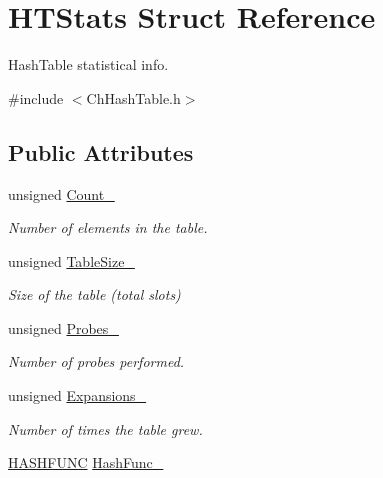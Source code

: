 \hypertarget{structHTStats}{\section{H\-T\-Stats Struct Reference}
\label{structHTStats}
}


Hash\-Table statistical info.  




{\ttfamily \#include $<$Ch\-Hash\-Table.\-h$>$}

\subsection*{Public Attributes}
\begin{DoxyCompactItemize}
\item 
\hypertarget{structHTStats_a4b58ca272c9d26e53e96209935b71640}{unsigned \hyperlink{structHTStats_a4b58ca272c9d26e53e96209935b71640}{Count\-\_\-}}\label{structHTStats_a4b58ca272c9d26e53e96209935b71640}

\begin{DoxyCompactList}\small\item\em Number of elements in the table. \end{DoxyCompactList}\item 
\hypertarget{structHTStats_aa41b26cb10af60fa575642a92a253c88}{unsigned \hyperlink{structHTStats_aa41b26cb10af60fa575642a92a253c88}{Table\-Size\-\_\-}}\label{structHTStats_aa41b26cb10af60fa575642a92a253c88}

\begin{DoxyCompactList}\small\item\em Size of the table (total slots) \end{DoxyCompactList}\item 
\hypertarget{structHTStats_a5f8a4b7dd26d477b0810b8e2d0362b67}{unsigned \hyperlink{structHTStats_a5f8a4b7dd26d477b0810b8e2d0362b67}{Probes\-\_\-}}\label{structHTStats_a5f8a4b7dd26d477b0810b8e2d0362b67}

\begin{DoxyCompactList}\small\item\em Number of probes performed. \end{DoxyCompactList}\item 
\hypertarget{structHTStats_aedd2ff3fc7953b3bc1cfb28152c2bcfb}{unsigned \hyperlink{structHTStats_aedd2ff3fc7953b3bc1cfb28152c2bcfb}{Expansions\-\_\-}}\label{structHTStats_aedd2ff3fc7953b3bc1cfb28152c2bcfb}

\begin{DoxyCompactList}\small\item\em Number of times the table grew. \end{DoxyCompactList}\item 
\hypertarget{structHTStats_a98aaa67feaecaba8a598d34b697fb298}{\hyperlink{ChHashTable_8h_a2e5c3d6d9eb14baf05abe0760e4a6a5a}{H\-A\-S\-H\-F\-U\-N\-C} \hyperlink{structHTStats_a98aaa67feaecaba8a598d34b697fb298}{Hash\-Func\-\_\-}}\label{structHTStats_a98aaa67feaecaba8a598d34b697fb298}


\end{DoxyCompactItemize}
